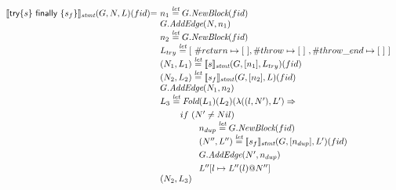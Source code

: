 \[\begin{array}{l@{}l@{~}l}
\transfun{\ircfgtryfin{s}{s_f}}_{\emph{stmt}}(G,N,L)(fid) & = &
	n_1 \letval G.\emph{NewBlock}(fid)\\
	& & G.\emph{AddEdge}(N,n_1)\\
	& & n_2 \letval G.\emph{NewBlock}(fid)\\
	& & L_{try} \letval [\ \#return \mapsto [\ ], \#throw \mapsto [\ ]\ , \#throw\_end \mapsto [\ ]\ ] \\
	& & (N_1,L_1) \letval \transfun{s}_{\emph{stmt}}(G,[n_1],L_{try})(fid)\\
	& & (N_2,L_2) \letval \transfun{s_f}_{\emph{stmt}}(G,[n_2],L)(fid)\\ %
	& & G.\emph{AddEdge}(N_1,n_2)\\
	& & L_3 \letval \Fold(L_1)(L_2)(\lambda((l,N'),L') \Rightarrow\\
	& & \phantom{L_3 \letval}if\ (N' \neq Nil)\\
	& & \phantom{L_3 \letval \Fold} n_{dup} \letval G.\emph{NewBlock}(fid)\\
	& & \phantom{L_3 \letval \Fold} (N'',L'') \letval \transfun{s_f}_{\emph{stmt}}(G,[n_{dup}],L')(fid)\\
	& & \phantom{L_3 \letval \Fold} G.\emph{AddEdge}(N',n_{dup})\\
	& & \phantom{L_3 \letval \Fold} L''[l \mapsto L''(l)@N'']\\
	& & (N_2,L_3)\\
	& & \\
\end{array}
\]


